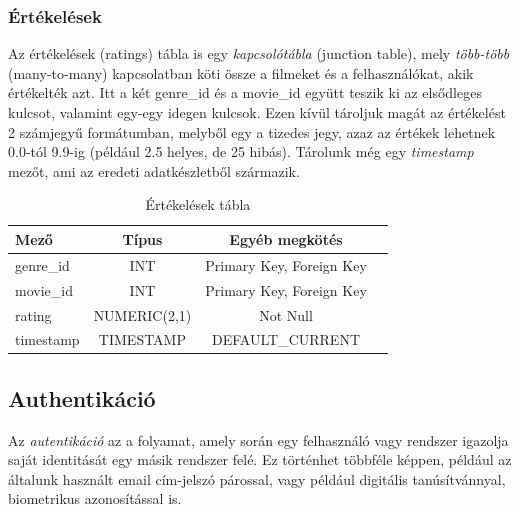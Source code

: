 \documentclass[
]{thesis-ekf}
\theoremstyle{definition}
\theoremstyle{remark}
\begin{document}
\subsubsection{Értékelések}
Az értékelések (ratings) tábla is egy \emph{kapcsolótábla} (junction table), mely \emph{több-több} (many-to-many) kapcsolatban köti össze a filmeket és a felhasználókat, akik értékelték azt. Itt a két genre\_id és a movie\_id együtt teszik ki az elsődleges kulcsot, valamint egy-egy idegen kulcsok. Ezen kívül tároljuk magát az értékelést 2 számjegyű formátumban, melyből egy a tizedes jegy, azaz  az értékek lehetnek 0.0-tól 9.9-ig (például 2.5 helyes, de 25 hibás). Tárolunk még egy \emph{timestamp} mezőt, ami az eredeti adatkészletből származik.

\begin{table}[!h]
	\centering
	\begin{tabular}{|l|c|c|c|} 
		\hline
		\textbf{Mező} & \textbf{Típus} & \textbf{Egyéb megkötés} \\ 
		\hline
		genre\_id & INT & Primary Key, Foreign Key \\ 
		\hline
		movie\_id & INT & Primary Key, Foreign Key \\ 
		\hline
		rating & NUMERIC(2,1) & Not Null \\ 
		\hline
		timestamp & TIMESTAMP & DEFAULT\_CURRENT \\ 
		\hline
	\end{tabular}
	\caption{Értékelések tábla}
	\label{tbl-ratings}
\end{table}


\subsection{Authentikáció}
\label{subsec-authentikacio-authorizacio}
Az \emph{autentikáció} az a folyamat, amely során egy felhasználó vagy rendszer igazolja saját identitását egy másik rendszer felé. Ez történhet többféle képpen, például az általunk használt email cím-jelszó párossal, vagy például digitális tanúsítvánnyal, biometrikus azonosítással is.\cite{wiki-authentication}
\end{document}
